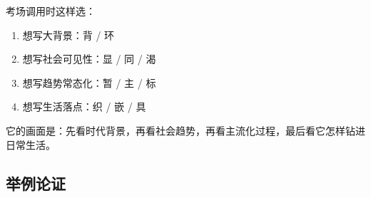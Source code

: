 ﻿\documentclass[lang=cn,11pt]{elegantbook}
\begin{document}
\begin{note}
考场调用时这样选：

\begin{enumerate}
  \item 想写大背景：背 / 环
  \item 想写社会可见性：显 / 同 / 渴
  \item 想写趋势常态化：暂 / 主 / 标
  \item 想写生活落点：织 / 嵌 / 具
\end{enumerate}

它的画面是：先看时代背景，再看社会趋势，再看主流化过程，最后看它怎样钻进日常生活。
\end{note}

\subsection{举例论证}
\end{document}
